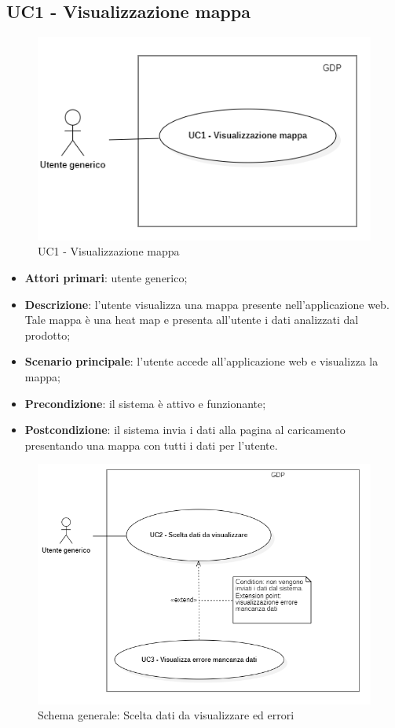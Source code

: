 \subsection{UC1 - Visualizzazione mappa}
\begin{center}
	\begin{figure}[H]
		\includegraphics[width=0.95\linewidth]{../immagini/attori_casi/vis_mappa.png}
		\caption{UC1 - Visualizzazione mappa}
	\end{figure}
\end{center}
\begin{itemize}
	\item \textbf{Attori primari}: utente generico;
	\item \textbf{Descrizione}: l'utente visualizza una mappa presente nell'applicazione web. Tale mappa è una heat map e presenta all'utente i dati analizzati dal prodotto;
	\item \textbf{Scenario principale}: l'utente accede all'applicazione web e visualizza la mappa;
	\item \textbf{Precondizione}: il sistema è attivo e funzionante;
	\item \textbf{Postcondizione}: il sistema invia i dati alla pagina al caricamento presentando una mappa con tutti i dati per l'utente.
\end{itemize}
\begin{center}
	\begin{figure}[H]
		\includegraphics[width=0.95\linewidth]{../immagini/attori_casi/uc2.png}
		\caption{Schema generale: Scelta dati da visualizzare ed errori}
	\end{figure}
\end{center}

